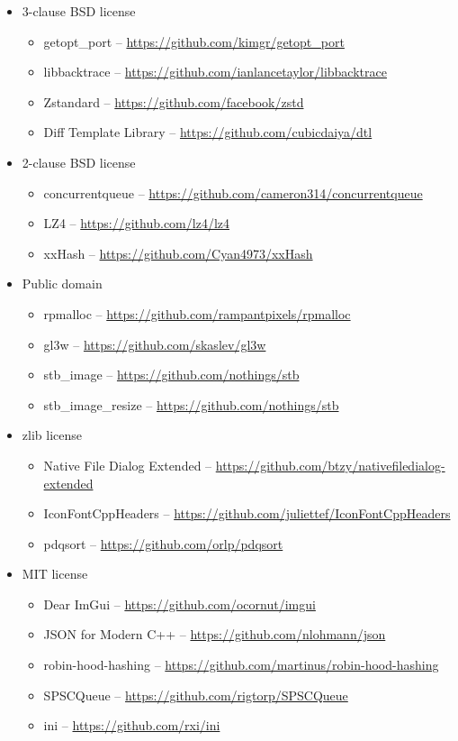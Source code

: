 \documentclass[hidelinks,titlepage,a4paper]{article}
\begin{document}
\begin{itemize}
\item 3-clause BSD license
\begin{itemize}
\item getopt\_port -- \url{https://github.com/kimgr/getopt\_port}
\item libbacktrace \faStar{} -- \url{https://github.com/ianlancetaylor/libbacktrace}
\item Zstandard -- \url{https://github.com/facebook/zstd}
\item Diff Template Library -- \url{https://github.com/cubicdaiya/dtl}
\end{itemize}

\item 2-clause BSD license
\begin{itemize}
\item concurrentqueue \faStar{} -- \url{https://github.com/cameron314/concurrentqueue}
\item LZ4 \faStar{} -- \url{https://github.com/lz4/lz4}
\item xxHash -- \url{https://github.com/Cyan4973/xxHash}
\end{itemize}

\item Public domain
\begin{itemize}
\item rpmalloc \faStar{} -- \url{https://github.com/rampantpixels/rpmalloc}
\item gl3w -- \url{https://github.com/skaslev/gl3w}
\item stb\_image -- \url{https://github.com/nothings/stb}
\item stb\_image\_resize -- \url{https://github.com/nothings/stb}
\end{itemize}

\item zlib license
\begin{itemize}
\item Native File Dialog Extended -- \url{https://github.com/btzy/nativefiledialog-extended}
\item IconFontCppHeaders -- \url{https://github.com/juliettef/IconFontCppHeaders}
\item pdqsort -- \url{https://github.com/orlp/pdqsort}
\end{itemize}

\item MIT license
\begin{itemize}
\item Dear ImGui -- \url{https://github.com/ocornut/imgui}
\item JSON for Modern C++ -- \url{https://github.com/nlohmann/json}
\item robin-hood-hashing -- \url{https://github.com/martinus/robin-hood-hashing}
\item SPSCQueue \faStar{} -- \url{https://github.com/rigtorp/SPSCQueue}
\item ini -- \url{https://github.com/rxi/ini}
\end{itemize}


\end{itemize}
\end{document}
